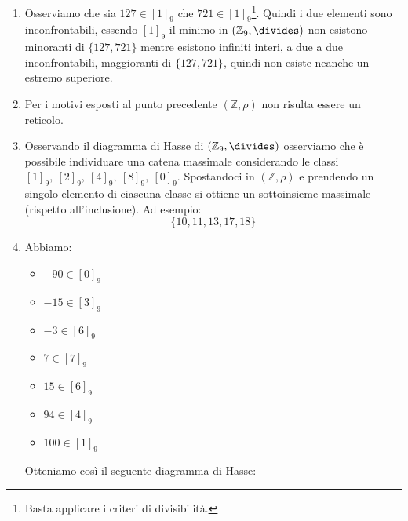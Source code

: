 \begin{enumerate}[label=(\textit{\roman*})]
\item Osserviamo che sia $127 \in [1]_{9}$ che $721 \in [1]_{9}$\footnote{Basta applicare i criteri di divisibilità.}. Quindi i due elementi sono inconfrontabili, essendo $[1]_{9}$ il minimo in $(\mathbb{Z}_{9},\divides)$ non esistono minoranti di $\{127,721\}$ mentre esistono infiniti interi, a due a due inconfrontabili, maggioranti di $\{127,721\}$, quindi non esiste neanche un estremo superiore.
\item Per i motivi esposti al punto precedente $(\mathbb{Z},\rho)$ non risulta essere un reticolo.
\item Osservando il diagramma di Hasse di $(\mathbb{Z}_{9},\divides)$ osserviamo che è possibile individuare una catena massimale considerando le classi $[1]_{9}, \ [2]_{9}, \ [4]_{9}, \ [8]_{9}, \ [0]_{9}$. Spostandoci in $(\mathbb{Z},\rho)$ e prendendo un singolo elemento di ciascuna classe si ottiene un sottoinsieme massimale (rispetto all'inclusione). Ad esempio:
\begin{displaymath}
	\{10,11,13,17,18\}
\end{displaymath}
\item Abbiamo:
\begin{itemize}
	\item $-90 \in [0]_{9}$
	\item $-15 \in [3]_{9}$
	\item $-3 \in [6]_{9}$
	\item $7 \in [7]_{9}$
	\item $15 \in [6]_{9}$
	\item $94 \in [4]_{9}$
	\item $100 \in [1]_{9}$
\end{itemize}
Otteniamo così il seguente diagramma di Hasse:
\begin{center}
\end{center}
\end{enumerate}
